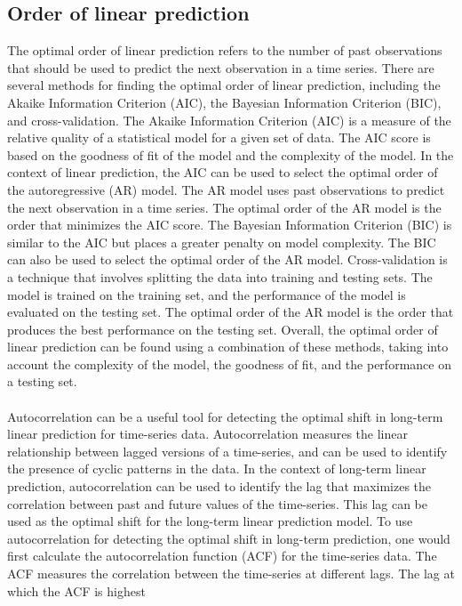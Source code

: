 \subsection{Order of linear prediction} \label{subsec:orderlp}
The optimal order of linear prediction refers to the number of past observations that should be used to predict the next
observation in a time series. There are several methods for finding the optimal order of linear prediction, including
the Akaike Information Criterion (AIC), the Bayesian Information Criterion (BIC), and cross-validation. The Akaike
Information Criterion (AIC) is a measure of the relative quality of a statistical model for a given set of data.
The AIC score is based on the goodness of fit of the model and the complexity of the model. In the context of linear
prediction, the AIC can be used to select the optimal order of the autoregressive (AR) model. The AR model uses past
observations to predict the next observation in a time series. The optimal order of the AR model is the order that
minimizes the AIC score. The Bayesian Information Criterion (BIC) is similar to the AIC but places a greater penalty
on model complexity. The BIC can also be used to select the optimal order of the AR model. Cross-validation is a
technique that involves splitting the data into training and testing sets. The model is trained on the training set, and
the performance of the model is evaluated on the testing set. The optimal order of the AR model is the order that produces
the best performance on the testing set. Overall, the optimal order of linear prediction can be found using a combination
of these methods, taking into account the complexity of the model, the goodness of fit, and the performance on a testing set.\\
\\
Autocorrelation can be a useful tool for detecting the optimal shift in long-term linear prediction for time-series data.
Autocorrelation measures the linear relationship between lagged versions of a time-series, and can be used to identify
the presence of cyclic patterns in the data. In the context of long-term linear prediction, autocorrelation can be
used to identify the lag that maximizes the correlation between past and future values of the time-series. This lag can
be used as the optimal shift for the long-term linear prediction model. To use autocorrelation for detecting the optimal
shift in long-term prediction, one would first calculate the autocorrelation function (ACF) for the time-series data.
The ACF measures the correlation between the time-series at different lags. The lag at which the ACF is highest
